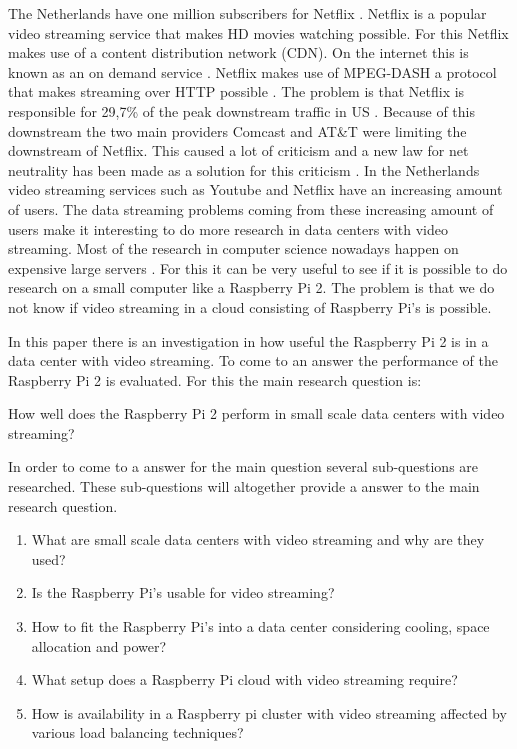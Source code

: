 \documentclass{sig-alternate-br}
\begin{document}
The Netherlands have one million subscribers for Netflix \cite{volkskrant}. Netflix is a popular video streaming service that makes HD movies watching possible. For this Netflix makes use of a content distribution network (CDN). On the internet this is known as an on demand service \cite{Adhikari:2012}. Netflix makes use of MPEG-DASH a protocol that makes streaming over HTTP possible \cite{martin:2013}. The problem is that Netflix is responsible for  29,7\% of the peak downstream traffic in US \cite{Adhikari:2012}. Because of this downstream the two main providers Comcast and  AT\&T were limiting the downstream of Netflix. This caused a lot of criticism and a new law for net neutrality has been made as a solution for this criticism \cite{net-neutrality}. \newline
In the Netherlands video streaming services such as Youtube and Netflix have an increasing amount of users. The data streaming problems coming from these increasing amount of users make it interesting to do more research in data centers with video streaming. Most of the research in computer science nowadays happen on expensive large servers \cite{tso:2013}. For this it can be very useful to see if it is possible to do research on a small computer like a Raspberry Pi 2. The problem is that we do not know if video streaming in a cloud consisting of Raspberry Pi's is possible. 

In this paper there is an investigation in how useful the Raspberry Pi 2 is in a data center with video streaming. To come to an answer the performance of the Raspberry Pi 2 is evaluated. For this the main research question is: 
\begin{center}
How well does the Raspberry Pi 2 perform in small scale data centers with video streaming? 
\end{center}

In order to come to a answer for the main question several sub-questions are researched. These sub-questions will altogether provide a answer to the main research question. 

\begin{enumerate}
	\item What are small scale data centers with video streaming and why are they used?
	\item Is the Raspberry Pi's usable for video streaming?
	\item How to fit the Raspberry Pi's into a data center considering cooling, space allocation and power?
	\item What setup does a Raspberry Pi cloud with video streaming require?
	\item How is availability in a Raspberry pi cluster with video streaming affected by various load balancing techniques? 
\end{enumerate}
\end{document}
